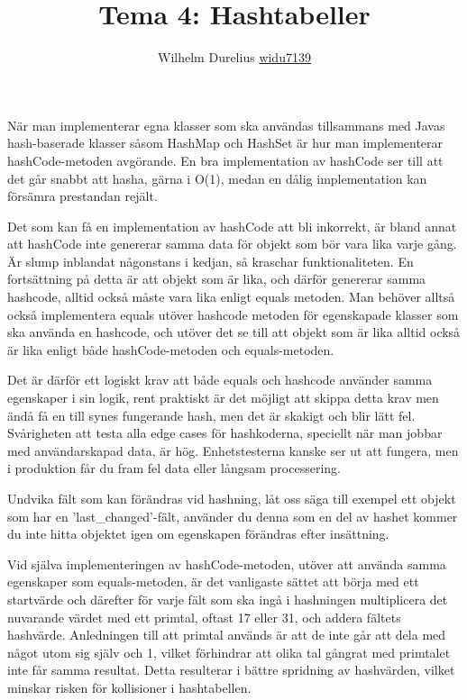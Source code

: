 \documentclass[a5paper,10pt,oneside]{article}
\title{Tema 4: Hashtabeller}
\author{Wilhelm Durelius \url{widu7139}}
\begin{document}
\maketitle


När man implementerar egna klasser som ska användas tillsammans med Javas hash-baserade klasser såsom HashMap och HashSet är hur man implementerar hashCode-metoden 
avgörande. En bra implementation av hashCode ser till att det går snabbt att hasha, gärna i O(1), medan en dålig implementation kan försämra prestandan rejält. 

Det som kan få en implementation av hashCode att bli inkorrekt, är bland annat att hashCode inte genererar samma data för objekt som bör vara lika varje gång. 
Är slump inblandat någonstans i kedjan, så kraschar funktionaliteten. En fortsättning på detta är att objekt som är lika, och därför genererar samma hashcode,
alltid också måste vara lika enligt equals metoden. Man behöver alltså också implementera equals utöver hashcode metoden för egenskapade klasser som ska använda en hashcode,
och utöver det se till att objekt som är lika alltid också är lika enligt både hashCode-metoden och equals-metoden.

Det är därför ett logiskt krav att både equals och hashcode använder samma egenskaper i sin logik,
rent praktiskt är det möjligt att skippa detta krav men ändå få en till synes fungerande hash, men det är skakigt och blir lätt fel.
Svårigheten att testa alla edge cases för hashkoderna, speciellt när man jobbar med användarskapad data, 
är hög. Enhetstesterna kanske ser ut att fungera, men i produktion får du fram fel data eller långsam processering.

Undvika fält som kan förändras vid hashning, låt oss säga till exempel ett objekt som har en 'last\_changed'-fält, använder du denna som en del av hashet kommer du inte hitta objektet igen
om egenskapen förändras efter insättning.

Vid själva implementeringen av hashCode-metoden, utöver att använda samma egenskaper som equals-metoden, är det vanligaste sättet att börja med ett startvärde och därefter för varje fält
som ska ingå i hashningen multiplicera det nuvarande värdet med ett primtal, oftast 17 eller 31, och addera fältets hashvärde. 
Anledningen till att primtal används är att de inte går att dela med något utom sig själv och 1, vilket förhindrar att olika tal gångrat med primtalet inte får samma resultat.
Detta resulterar i bättre spridning av hashvärden, vilket minskar risken för kollisioner i hashtabellen. 
\end{document}
